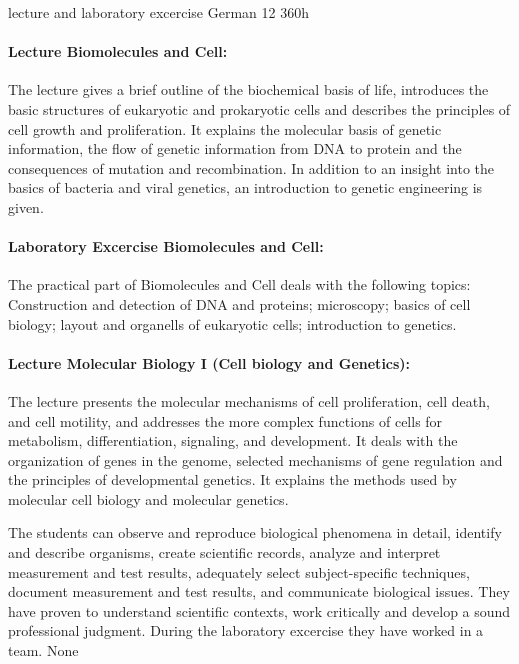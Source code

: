 {lecture and laboratory excercise}
{German}
{12}
{360h}
{\paragraph{Lecture Biomolecules and Cell:} The lecture gives a brief outline of the biochemical basis of life, introduces the basic structures of eukaryotic and prokaryotic cells and describes the principles of cell growth and proliferation. It explains the molecular basis of genetic information, the flow of genetic information from DNA to protein and the consequences of mutation and recombination. In addition to an insight into the basics of bacteria and viral genetics, an introduction to genetic engineering is given.
\paragraph{Laboratory Excercise Biomolecules and Cell:} The practical part of Biomolecules and Cell deals with the following topics:
Construction and detection of DNA and proteins;
microscopy; basics of cell biology; layout and organells of eukaryotic cells; introduction to genetics.
\paragraph{Lecture Molecular Biology I (Cell biology and Genetics): } The lecture presents the molecular mechanisms of cell proliferation, cell death, and cell motility, and addresses the more complex functions of cells for metabolism, differentiation, signaling, and development. It deals with the organization of genes in the genome, selected mechanisms of gene regulation and the principles of developmental genetics. It explains the methods used by molecular cell biology and molecular genetics.}
{The students can observe and reproduce biological phenomena in detail, identify and describe organisms, create scientific records, analyze and interpret measurement and test results, adequately select subject-specific techniques, document measurement and test results, and communicate biological issues. They have proven to understand scientific contexts, work critically and develop a sound professional judgment. During the laboratory excercise they have worked in a team.}
{None}